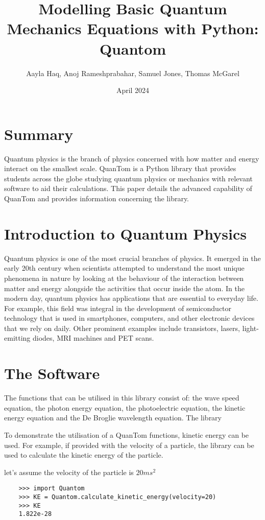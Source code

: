 \documentclass{article}
\title{Modelling Basic Quantum Mechanics Equations with Python: Quantom}
\author{Aayla Haq, Anoj Rameshprabahar, Samuel Jones, Thomas McGarel}
\date{April 2024}
\begin{document}
\maketitle

\section{Summary}
Quantum physics is the branch of physics concerned with how matter and energy interact on the smallest scale. QuanTom is a Python library that provides students across the globe studying quantum physics or mechanics with relevant software to aid their calculations. This paper details the advanced capability of QuanTom and provides information concerning the library.

\section{Introduction to Quantum Physics}
Quantum physics is one of the most crucial branches of physics. It emerged in the early 20th century when scientists attempted to understand the most unique phenomena in nature by looking at the behaviour of the interaction between matter and energy alongside the activities that occur inside the atom. In the modern day, quantum physics has applications that are essential to everyday life. For example, this field was integral in the development of semiconductor technology that is used in smartphones, computers, and other electronic devices that we rely on daily. Other prominent examples include transistors, lasers, light-emitting diodes, MRI machines and PET scans.

\section{The Software}
The functions that can be utilised in this library consist of: the wave speed equation, the photon energy equation, the photoelectric equation, the kinetic energy equation and the De Broglie wavelength equation. The library 

To demonstrate the utilisation of a QuanTom functions, kinetic energy can be used. For example, if provided with the velocity of a particle, the library can be used to calculate the kinetic energy of the particle. 

let's assume the velocity of the particle is $20ms^2$
\begin{verbatim}
    >>> import Quantom
    >>> KE = Quantom.calculate_kinetic_energy(velocity=20)
    >>> KE
    1.822e-28
\end{verbatim}
\end{document}
